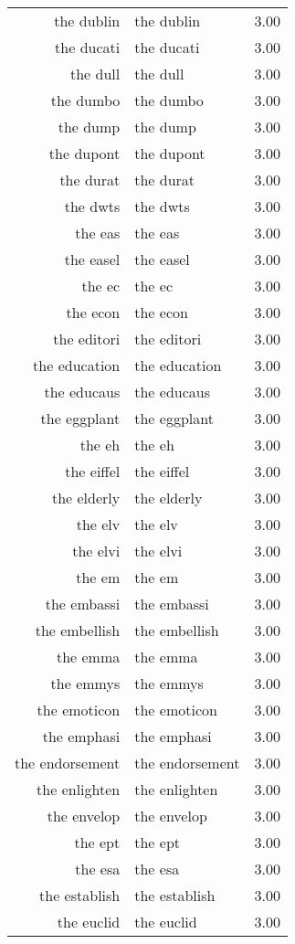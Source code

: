 \begin{table}[ht]
\begin{tabular}{rlr}
  the dublin & the dublin & 3.00 \\ 
  the ducati & the ducati & 3.00 \\ 
  the dull & the dull & 3.00 \\ 
  the dumbo & the dumbo & 3.00 \\ 
  the dump & the dump & 3.00 \\ 
  the dupont & the dupont & 3.00 \\ 
  the durat & the durat & 3.00 \\ 
  the dwts & the dwts & 3.00 \\ 
  the eas & the eas & 3.00 \\ 
  the easel & the easel & 3.00 \\ 
  the ec & the ec & 3.00 \\ 
  the econ & the econ & 3.00 \\ 
  the editori & the editori & 3.00 \\ 
  the education & the education & 3.00 \\ 
  the educaus & the educaus & 3.00 \\ 
  the eggplant & the eggplant & 3.00 \\ 
  the eh & the eh & 3.00 \\ 
  the eiffel & the eiffel & 3.00 \\ 
  the elderly & the elderly & 3.00 \\ 
  the elv & the elv & 3.00 \\ 
  the elvi & the elvi & 3.00 \\ 
  the em & the em & 3.00 \\ 
  the embassi & the embassi & 3.00 \\ 
  the embellish & the embellish & 3.00 \\ 
  the emma & the emma & 3.00 \\ 
  the emmys & the emmys & 3.00 \\ 
  the emoticon & the emoticon & 3.00 \\ 
  the emphasi & the emphasi & 3.00 \\ 
  the endorsement & the endorsement & 3.00 \\ 
  the enlighten & the enlighten & 3.00 \\ 
  the envelop & the envelop & 3.00 \\ 
  the ept & the ept & 3.00 \\ 
  the esa & the esa & 3.00 \\ 
  the establish & the establish & 3.00 \\ 
  the euclid & the euclid & 3.00 \\ 

\end{tabular}
\end{table}
